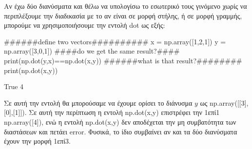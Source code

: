 Αν έχω δύο διανύσματα και θέλω να υπολογίσω το εσωτερικό τους γινόμενο χωρίς να περιπλέξουμε την διαδικασία με το αν είναι σε μορφή στήλης, ή σε μορφή γραμμής, μπορούμε να χρησιμοποιήσουμε την εντολή {\en dot} ως εξής:
\en
\begin{python}
######define two vectors##########
x = np.array([1,2,1])
y = np.array([3,0,1])
####do we get the same result?####
print(np.dot(y,x)==np.dot(x,y))
######what is that result?########
print(np.dot(x,y))
\end{python}
\vspace*{-0.7cm}
\begin{codeout}
True
4
\end{codeout}
\gr
Σε αυτή την εντολή θα μπορούσαμε να έχουμε ορίσει το διάνυσμα $y$ ως {\en np.array([[3],[0],[1]])}. Σε αυτή την περίπτωση η εντολή {\en np.dot(x,y)} επιστρέφει την 1επί1 {\en np.array([4])}, ενώ η εντολή {\en np.dot(x,y)} δεν αποδέχεται την μη συμβατότητα των διαστάσεων και πετάει {\en error}. Φυσικά, το ίδιο συμβαίνει αν και τα δύο διανύσματα έχουν την μορφή 1επί3.  